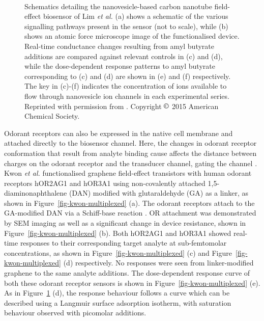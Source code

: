 \documentclass[
  a4paper,
]{scrbook}
\begin{document}
\begin{figure}
\begin{minipage}[t]{0.45\linewidth}
{{}

}

\end{minipage}%
%
\begin{minipage}[t]{0.01\linewidth}

{\centering 

~

}

\end{minipage}%

\caption[Schematics detailing the nanovesicle-based carbon nanotube
field-effect biosensor of Lim \emph{et
al.}]{\label{fig-lim-ion-channel}Schematics detailing the
nanovesicle-based carbon nanotube field-effect biosensor of Lim \emph{et
al.} (a) shows a schematic of the various signalling pathways present in
the sensor (not to scale), while (b) shows an atomic force microscope
image of the functionalised device. Real-time conductance changes
resulting from amyl butyrate additions are compared against relevant
controls in (c) and (d), while the dose-dependent response patterns to
amyl butyrate corresponding to (c) and (d) are shown in (e) and (f)
respectively. The key in (c)-(f) indicates the concentration of ions
available to flow through nanovesicle ion channels in each experimental
series. Reprinted with permission from \autocite{Lim2015}. Copyright
\(\copyright\) 2015 American Chemical Society.}

\end{figure}

Odorant receptors can also be expressed in the native cell membrane and
attached directly to the biosensor channel. Here, the changes in odorant
receptor conformation that result from analyte binding cause affects the
distance between charges on the odorant receptor and the transducer
channel, gating the channel \autocite{Kwon2015,Dung2018}. Kwon \emph{et
al.} functionalised graphene field-effect transistors with human odorant
receptors hOR2AG1 and hOR3A1 using non-covalently attached
1,5-diaminonaphthalene (DAN) modified with glutaraldehyde (GA) as a
linker, as shown in Figure~\ref{fig-kwon-multiplexed} (a). The odorant
receptors attach to the GA-modified DAN via a Schiff-base reaction
\autocite{Bhatt2021}. OR attachment was demonstrated by SEM imaging as
well as a significant change in device resistance, shown in
Figure~\ref{fig-kwon-multiplexed} (b). Both hOR2AG1 and hOR3A1 showed
real-time responses to their corresponding target analyte at
sub-femtomolar concentrations, as shown in
Figure~\ref{fig-kwon-multiplexed} (c) and
Figure~\ref{fig-kwon-multiplexed} (d) respectively. No responses were
seen from linker-modified graphene to the same analyte additions. The
dose-dependent response curve of both these odorant receptor sensors is
shown in Figure~\ref{fig-kwon-multiplexed} (e). As in
Figure~\ref{fig-lim-ion-channel} (d), the response behaviour follows a
curve which can be described using a Langmuir surface adsorption
isotherm, with saturation behaviour observed with picomolar additions.
\end{document}
